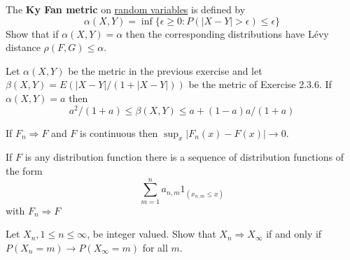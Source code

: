   \begin{exercise}[Durrett 3.2.7]
    The \textbf{Ky Fan metric} on \hyperref[def:random-variable]{random variables} is defined by
    \begin{equation*}
      \alpha(X, Y) = \inf\{\epsilon \geq 0 : P(|X - Y| > \epsilon) \leq \epsilon\}
    \end{equation*}
    Show that if $\alpha(X, Y) = \alpha$ then the corresponding distributions have Lévy distance $\rho(F, G) \leq \alpha$.
  \end{exercise}
  \begin{solution}

  \end{solution}

  \begin{exercise}[Durrett 3.2.8]
    Let $\alpha(X, Y)$ be the metric in the previous exercise and let $\beta(X, Y) = E(|X - Y|/(1 + |X - Y|))$ be the metric of Exercise 2.3.6. If $\alpha(X, Y) = a$ then
    \begin{equation*}
      a^2/(1 + a) \leq \beta(X, Y) \leq a + (1 - a)a/(1 + a)
    \end{equation*}
  \end{exercise}
  \begin{solution}

  \end{solution}

  \begin{exercise}[Durrett 3.2.9]
    If $F_n \Rightarrow F$ and $F$ is continuous then $\sup_x |F_n(x) - F(x)| \to 0$.
  \end{exercise}
  \begin{solution}

  \end{solution}

  \begin{exercise}[Durrett 3.2.10]
    If $F$ is any distribution function there is a sequence of distribution functions of the form 
    \begin{equation*}
      \sum_{m=1}^n a_{n,m} 1_{(x_{n,m} \leq x)}
    \end{equation*}
    with $F_n \Rightarrow F$
  \end{exercise}
  \begin{solution}

  \end{solution}

  \begin{exercise}[Durrett 3.2.11]
    Let $X_n, 1 \leq n \leq \infty$, be integer valued. Show that $X_n \Rightarrow X_\infty$ if and only if $P(X_n = m) \to P(X_\infty = m)$ for all $m$.
  \end{exercise}
  \begin{solution}

  \end{solution}

